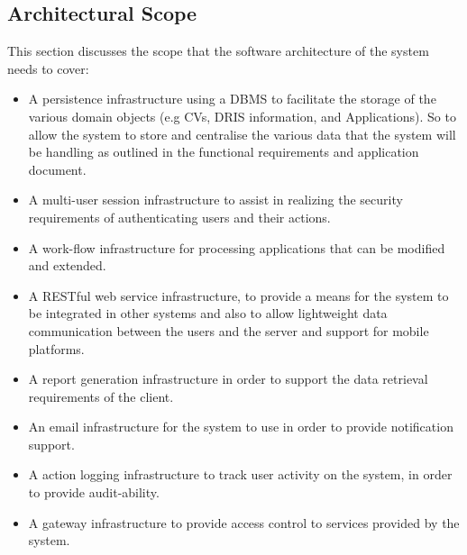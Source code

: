 \documentclass[12pt]{article}
\begin{document}
\subsection{Architectural Scope}
This section discusses the scope that the software architecture of the system needs to cover:
\begin{itemize}
\item A persistence infrastructure using a DBMS to facilitate the storage of the various domain objects (e.g CVs, DRIS information, and Applications). So to allow the system to store and centralise the various data that the system will be handling as outlined in the functional requirements and application document.
\item A multi-user session infrastructure to assist in realizing the security requirements of authenticating users and their actions.
\item A work-flow infrastructure for processing applications that can be modified and extended. 
\item A RESTful web service infrastructure, to provide a means for the system to be integrated in other systems and also to allow lightweight data communication between the users and the server and support for mobile platforms. 
\item A report generation infrastructure in order to support the data retrieval requirements of the client.
\item An email infrastructure for the system to use in order to provide notification support.
\item A action logging infrastructure to track user activity on the system, in order to provide audit-ability.
\item A gateway infrastructure to provide access control to services provided by the system.

\end{itemize}

\newpage
\end{document}
